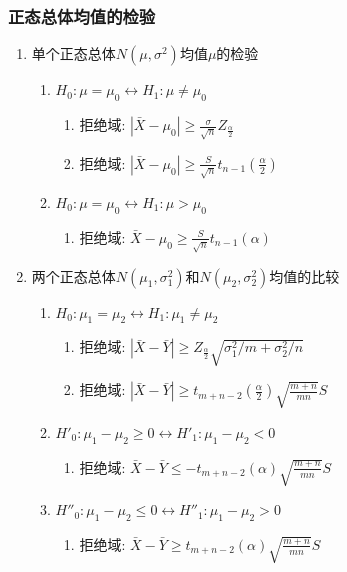 \documentclass[10pt,a4paper,nofonts]{ctexart}
\renewcommand{\le}{\leqslant}
\renewcommand{\ge}{\geqslant}
\begin{document}
\begin{multicols}{2}
\subsubsection{正态总体均值的检验}

\begin{enumerate}

\item 单个正态总体$N(\mu,\sigma^2)$均值$\mu$的检验
\begin{enumerate}
\item $H_0:\mu=\mu_0\leftrightarrow H_1:\mu\neq\mu_0$
\begin{enumerate}
\item 拒绝域: $|\bar{X}-\mu_0|\ge\frac{\sigma}{\sqrt{n}}Z_{\frac{\alpha}{2}}$
\item 拒绝域: $|\bar{X}-\mu_0|\ge\frac{S}{\sqrt{n}}t_{n-1}{(\frac{\alpha}{2})}$
\end{enumerate}
\item $H_0:\mu=\mu_0\leftrightarrow H_1:\mu>\mu_0$
\begin{enumerate}
\item 拒绝域: $\bar{X}-\mu_0\ge\frac{S}{\sqrt{n}}t_{n-1}{(\alpha)}$
\end{enumerate}
\end{enumerate}

\item 两个正态总体$N(\mu_1,\sigma_1^2)$和$N(\mu_2,\sigma_2^2)$均值的比较
\begin{enumerate}
\item $H_0:\mu_1=\mu_2\leftrightarrow H_1:\mu_1\neq\mu_2$
\begin{enumerate}
\item 拒绝域: $|\bar{X}-\bar{Y}|\ge Z_{\frac{\alpha}{2}}\sqrt{\sigma_1^2/m+\sigma_2^2/n}$
\item 拒绝域: $|\bar{X}-\bar{Y}|\ge t_{m+n-2}{(\frac{\alpha}{2})}\sqrt{\frac{m+n}{mn}}S$
\end{enumerate}
\item $H'_0:\mu_1-\mu_2\ge0\leftrightarrow H'_1:\mu_1-\mu_2<0$
\begin{enumerate}
\item 拒绝域: $\bar{X}-\bar{Y}\le -t_{m+n-2}{(\alpha)}\sqrt{\frac{m+n}{mn}}S$
\end{enumerate}
\item $H''_0:\mu_1-\mu_2\le0\leftrightarrow H''_1:\mu_1-\mu_2>0$
\begin{enumerate}
\item 拒绝域: $\bar{X}-\bar{Y}\ge t_{m+n-2}{(\alpha)}\sqrt{\frac{m+n}{mn}}S$
\end{enumerate}
\end{enumerate}


\end{enumerate}
\end{multicols}
\end{document}
